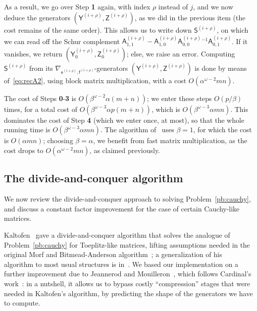 \documentclass{sig-alternate}
\newcommand{\ve}{\ensuremath{\mathsf{e}}}
\newcommand{\vf}{\ensuremath{\mathsf{f}}}
\newcommand{\mA}{\ensuremath{\mathsf{A}}}
\newcommand{\mS}{\ensuremath{\mathsf{S}}}
\newcommand{\mY}{\ensuremath{\mathsf{Y}}}
\newcommand{\mZ}{\ensuremath{\mathsf{Z}}}
\begin{document}
As a result, we go over Step {\bf 1} again, with index $\rho$ instead
of $j$, and we now deduce the generators
$(\mY^{(i+\rho)},\mZ^{(i+\rho)})$, as we did in the previous item (the
cost remains of the same order).  This allows us to write down 
$\mS^{(i+\rho)}$, on which we can read off the Schur complement
$\mA^{(i+\rho)}_{1,1} - \mA^{(i+\rho)}_{1,0} \mA^{(i+\rho)}_{0,0}{}^{-1}
\mA^{(i+\rho)}_{0,1}$.  If it vanishes, we return
$(\mY^{(i+\rho)}_0,\mZ^{(i+\rho)}_{0})$; else, we raise an error. Computing
$\mS^{(i+\rho)}$ from its
$\nabla_{\ve^{(i+\rho)},\vf^{(i+\rho)}}$-generators
$(\mY^{(i+\rho)},\mZ^{(i+\rho)})$ is done by means of~\eqref{eq:recA2},
using block matrix multiplication, with a cost 
$O(\alpha^{\omega-2} mn)$.

\medskip

The cost of Steps {\bf 0}-{\bf 3} is $O(\beta^{\omega-2} \alpha
(m+n))$; we enter these steps $O(p/\beta)$ times, for a total cost of
$O(\beta^{\omega-3} \alpha p(m+n))$, which is $O(\beta^{\omega-3}
\alpha mn)$. This dominates the cost of Step {\bf 4} (which we enter
once, at most), so that the whole running time is $O(\beta^{\omega-3}
\alpha mn)$. The algorithm of~\cite{Mouilleron08} uses $\beta=1$, for
which the cost is $O(\alpha mn)$; choosing $\beta=\alpha$, we benefit
from fast matrix multiplication, as the cost drops to
$O(\alpha^{\omega-2} mn)$, as claimed previously.


\subsection{The divide-and-conquer algorithm}

We now review the divide-and-conquer approach to solving
Problem~\ref{pb:cauchy}, and discuss a constant factor improvement for
the case of certain Cauchy-like matrices. 

Kaltofen~\cite{Kaltofen94} gave a divide-and-conquer algorithm that
solves the analogue of Problem~\ref{pb:cauchy} for Toeplitz-like
matrices, lifting assumptions needed in the original Morf and
Bitmead-Anderson algorithm~\cite{Morf80,BiAn80}; a generalization of
his algorithm to most usual structures is in~\cite{Pan01}. We based
our implementation on a further improvement due to Jeannerod and
Mouilleron~\cite{JeMo10}, which follows Cardinal's
work~\cite{Cardinal99}: in a nutshell, it allows us to bypass
costly ``compression'' stages that were needed in Kaltofen's
algorithm, by predicting the shape of the generators we have to
compute.
\end{document}
